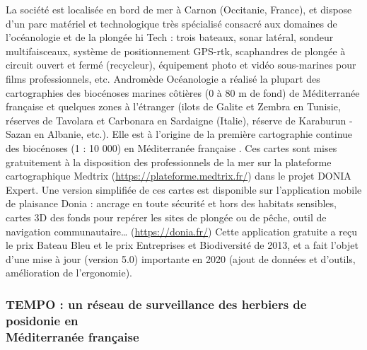 La société est localisée en bord de mer à Carnon (Occitanie, France), et dispose d’un parc matériel et technologique très spécialisé consacré aux domaines de l'océanologie et de la plongée hi Tech : trois bateaux, sonar latéral, sondeur multifaisceaux, système de positionnement GPS-rtk, scaphandres de plongée à circuit ouvert et fermé (recycleur), équipement photo et vidéo sous-marines pour films professionnels, etc. Andromède Océanologie a réalisé la plupart des cartographies des biocénoses marines côtières (0 à 80 m de fond) de Méditerranée française et quelques zones à l’étranger (ilots de Galite et Zembra en Tunisie, réserves de Tavolara et Carbonara en Sardaigne (Italie), réserve de Karaburun - Sazan en Albanie, etc.). Elle est à l’origine de la première cartographie continue des biocénoses (1 : 10 000) en Méditerranée française \citep{andromede-oceanologie_donia_2014}. Ces cartes sont mises gratuitement à la disposition des professionnels de la mer sur la plateforme cartographique Medtrix (\href{https://plateforme.medtrix.fr/}{https://plateforme.medtrix.fr/}) dans le projet DONIA Expert. Une version simplifiée de ces cartes est disponible sur l’application mobile de plaisance Donia : ancrage en toute sécurité et hors des habitats sensibles, cartes 3D des fonds pour repérer les sites de plongée ou de pêche, outil de navigation communautaire… (\href{https://donia.fr/}{https://donia.fr/}) Cette application gratuite a reçu le prix Bateau Bleu et le prix Entreprises et Biodiversité de 2013, et a fait l’objet d’une mise à jour (version 5.0) importante en 2020 (ajout de données et d’outils, amélioration de l’ergonomie).

\subsubsection{TEMPO : un réseau de surveillance des herbiers de posidonie en \\ Méditerranée française}\label{intro.2.3.2}

